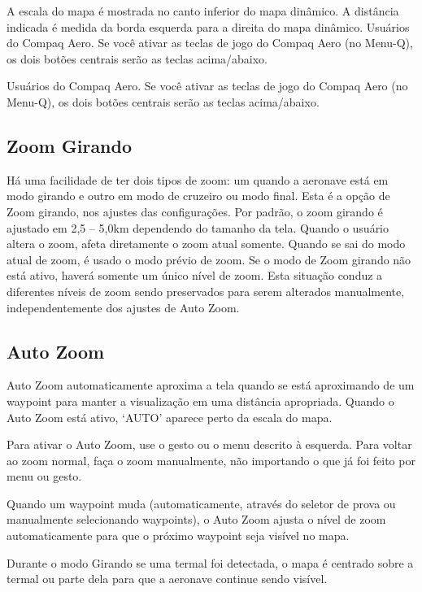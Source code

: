 A escala do mapa é mostrada no canto inferior do mapa dinâmico.  A distância indicada é medida da borda esquerda para a direita do mapa dinâmico.
Usuários do Compaq Aero.  Se você ativar as teclas de jogo do Compaq Aero (no Menu-Q), os dois botões centrais serão as teclas acima/abaixo.

Usuários do Compaq Aero.  Se você ativar as teclas de jogo do Compaq Aero (no Menu-Q), os dois botões centrais serão as teclas acima/abaixo.

\subsection*{Zoom Girando}
Há uma facilidade de ter dois tipos de zoom: um quando a aeronave está em modo girando e outro em modo de cruzeiro ou modo final.  Esta é a opção de Zoom girando, nos ajustes das configurações.  Por padrão, o zoom girando é ajustado em 2,5 – 5,0km dependendo do tamanho da tela.  Quando o usuário altera o zoom, afeta diretamente o zoom atual somente.  Quando se sai do modo atual de zoom, é usado o modo prévio de zoom. Se o modo de Zoom girando não está ativo, haverá somente um único nível de zoom.  Esta situação conduz a diferentes níveis de zoom sendo preservados para serem alterados manualmente, independentemente dos ajustes de Auto Zoom.
 
\subsection*{Auto Zoom}
Auto Zoom automaticamente aproxima a tela quando se está aproximando de um waypoint 
para manter a visualização em uma distância apropriada.  
Quando o Auto Zoom está ativo, ‘AUTO’ aparece perto da escala do mapa.

Para ativar o Auto Zoom, use o gesto  ou o menu descrito à esquerda.  
Para voltar ao zoom normal, faça o zoom manualmente, não importando o que já foi 
feito por menu ou gesto. 

Quando um waypoint muda (automaticamente, através do seletor de prova ou manualmente 
selecionando waypoints), o Auto Zoom ajusta o nível de zoom automaticamente para que 
o próximo waypoint seja visível no mapa.

Durante o modo Girando se uma termal foi detectada, o mapa é centrado sobre a termal ou parte dela para que a aeronave continue sendo visível.
 
